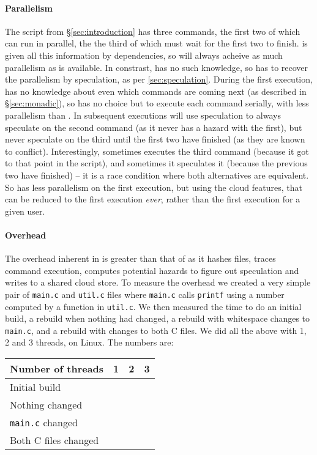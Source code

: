 \paragraph{Parallelism} The script from \S\ref{sec:introduction} has three commands, the first two of which can run in parallel, the the third of which must wait for the first two to finish. \Make is given all this information by dependencies, so will always acheive as much parallelism as is available. In constrast, \Rattle has no such knowledge, so has to recover the parallelism by speculation, as per \ref{sec:speculation}. During the first execution, \Rattle has no knowledge about even which commands are coming next (as described in \S\ref{sec:monadic}), so has no choice but to execute each command serially, with less parallelism than \Make. In subsequent executions \Rattle will use speculation to always speculate on the second command (as it never has a hazard with the first), but never speculate on the third until the first two have finished (as they are known to conflict). Interestingly, sometimes \Rattle executes the third command (because it got to that point in the script), and sometimes it speculates it (because the previous two have finished) -- it is a race condition where both alternatives are equivalent. So \Rattle has less parallelism on the first execution, but using the cloud features, that can be reduced to the first execution \emph{ever}, rather than the first execution for a given user.

\paragraph{Overhead} The overhead inherent in \Rattle is greater than that of \Make as it hashes files, traces command execution, computes potential hazards to figure out speculation and writes to a shared cloud store. To measure the overhead we created a very simple pair of \texttt{main.c} and \texttt{util.c} files where \texttt{main.c} calls \texttt{printf} using a number computed by a function in \texttt{util.c}. We then measured the time to do an initial build, a rebuild when nothing had changed, a rebuild with whitespace changes to \texttt{main.c}, and a rebuild with changes to both C files. We did all the above with 1, 2 and 3 threads, on Linux. The numbers are:

\begin{tabular}{l|r|r|r}
Number of threads & 1 & 2 & 3 \\
\hline
Initial build \\
Nothing changed \\
\texttt{main.c} changed \\
Both C files changed \\
\end{tabular}


